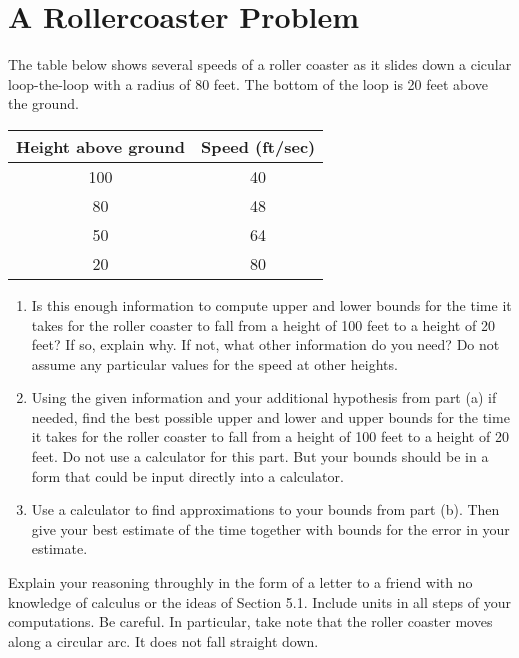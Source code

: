 \documentclass{ximera}
\begin{document}
\section{A Rollercoaster Problem}


\begin{exercise}  \label{EXKjdDMFne3}

The table below shows several speeds of a roller coaster as it slides down a cicular loop-the-loop with a radius of 80 feet. The bottom of the loop is 20 feet above the ground. 

\begin{tabular}{|c|c|}
\hline
Height above ground & Speed (ft/sec) \\
\hline
100 & 40 \\  \hline
80 & 48 \\ \hline
50 & 64 \\ \hline
20 & 80 \\
\hline
\end{tabular}

\begin{enumerate}
\item Is this enough information to compute upper and lower bounds for the time it takes for the roller coaster to fall from a height of 100 feet to a height of 20 feet? If so, explain why. If not, what other information do you need? Do not assume any particular values for the speed at other heights.

\item Using the given information and your additional hypothesis from part (a) if needed, find the best possible upper and lower and upper bounds for the time it takes for the roller coaster to fall from a height of 100 feet to a height of 20 feet. Do not use a calculator for this part. But your bounds should be in a form that could be input directly into a calculator.

\item Use a calculator to find approximations to your bounds from part (b). Then give your best estimate of the time together with bounds for the error in your estimate.

\end{enumerate}

Explain your reasoning throughly in the form of a letter to a friend with no knowledge of calculus or the ideas of Section 5.1. Include units in all steps of your computations. Be careful. In particular, take note that the roller coaster moves along a circular arc. It does not fall straight down.

\end{exercise}
\end{document}
